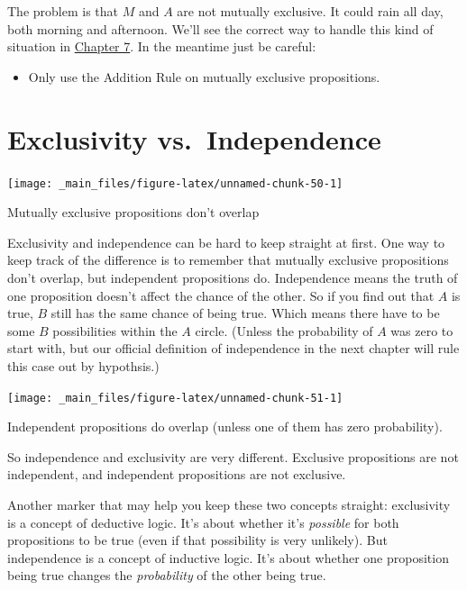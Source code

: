 \documentclass[justified]{tufte-book}
\newenvironment{warning}{\begin{itemize}\item[\faBan]}{\end{itemize}}
\theoremstyle{definition}
\theoremstyle{definition}
\theoremstyle{definition}
\theoremstyle{definition}
\theoremstyle{remark}
\begin{document}
The problem is that \(M\) and \(A\) are not mutually exclusive. It could rain all day, both morning and afternoon. We'll see the correct way to handle this kind of situation in \protect\hyperlink{calculating-probabilities-part-2}{Chapter 7}. In the meantime just be careful:

\begin{warning}
Only use the Addition Rule on mutually exclusive propositions.
\end{warning}

\hypertarget{exclusivity-vs.-independence}{%
\section{Exclusivity vs.~Independence}\label{exclusivity-vs.-independence}}

\begin{marginfigure}
\texttt{[image: \_main\_files/figure-latex/unnamed-chunk-50-1]} \caption[Mutually exclusive propositions don't overlap]{Mutually exclusive propositions don't overlap}\label{fig:unnamed-chunk-50}
\end{marginfigure}

Exclusivity and independence can be hard to keep straight at first. One way to keep track of the difference is to remember that mutually exclusive propositions don't overlap, but independent propositions do. Independence means the truth of one proposition doesn't affect the chance of the other. So if you find out that \(A\) is true, \(B\) still has the same chance of being true. Which means there have to be some \(B\) possibilities within the \(A\) circle. (Unless the probability of \(A\) was zero to start with, but our official definition of independence in the next chapter will rule this case out by hypothsis.)

\begin{marginfigure}
\texttt{[image: \_main\_files/figure-latex/unnamed-chunk-51-1]} \caption[Independent propositions do overlap (unless one of them has zero probability)]{Independent propositions do overlap (unless one of them has zero probability).}\label{fig:unnamed-chunk-51}
\end{marginfigure}

So independence and exclusivity are very different. Exclusive propositions are not independent, and independent propositions are not exclusive.

Another marker that may help you keep these two concepts straight: exclusivity is a concept of deductive logic. It's about whether it's \emph{possible} for both propositions to be true (even if that possibility is very unlikely). But independence is a concept of inductive logic. It's about whether one proposition being true changes the \emph{probability} of the other being true.
\end{document}
